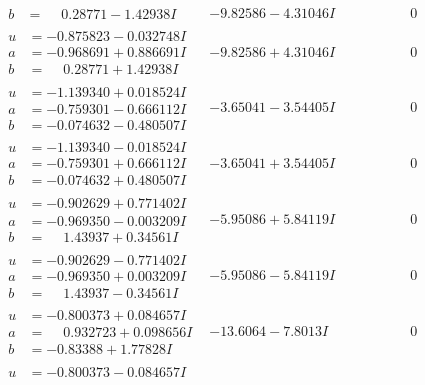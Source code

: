 \documentclass[1p]{elsarticle_modified}
\theoremstyle{definition}
\begin{document}
$$\begin{array}{c|c|c}
\begin{aligned}
b &= \phantom{-}0.28771 - 1.42938 I\end{aligned}
 & -9.82586 - 4.31046 I & \phantom{-0.000000 } 0 \\ \hline\begin{aligned}
u &= -0.875823 - 0.032748 I \\
a &= -0.968691 + 0.886691 I \\
b &= \phantom{-}0.28771 + 1.42938 I\end{aligned}
 & -9.82586 + 4.31046 I & \phantom{-0.000000 } 0 \\ \hline\begin{aligned}
u &= -1.139340 + 0.018524 I \\
a &= -0.759301 - 0.666112 I \\
b &= -0.074632 - 0.480507 I\end{aligned}
 & -3.65041 - 3.54405 I & \phantom{-0.000000 } 0 \\ \hline\begin{aligned}
u &= -1.139340 - 0.018524 I \\
a &= -0.759301 + 0.666112 I \\
b &= -0.074632 + 0.480507 I\end{aligned}
 & -3.65041 + 3.54405 I & \phantom{-0.000000 } 0 \\ \hline\begin{aligned}
u &= -0.902629 + 0.771402 I \\
a &= -0.969350 - 0.003209 I \\
b &= \phantom{-}1.43937 + 0.34561 I\end{aligned}
 & -5.95086 + 5.84119 I & \phantom{-0.000000 } 0 \\ \hline\begin{aligned}
u &= -0.902629 - 0.771402 I \\
a &= -0.969350 + 0.003209 I \\
b &= \phantom{-}1.43937 - 0.34561 I\end{aligned}
 & -5.95086 - 5.84119 I & \phantom{-0.000000 } 0 \\ \hline\begin{aligned}
u &= -0.800373 + 0.084657 I \\
a &= \phantom{-}0.932723 + 0.098656 I \\
b &= -0.83388 + 1.77828 I\end{aligned}
 & -13.6064 - 7.8013 I & \phantom{-0.000000 } 0 \\ \hline\begin{aligned}
u &= -0.800373 - 0.084657 I \\

\end{aligned}
\end{array}$$
\end{document}

